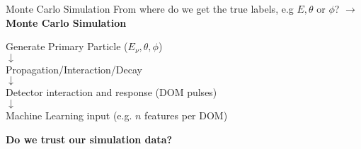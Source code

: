 \begin{frame}{Monte Carlo Simulation}
    From where do we get the true labels, e.g $E, \theta$ or $\phi$?
    $\rightarrow$ \textbf{Monte Carlo Simulation} \\
    \vspace{1em}
    \begin{center}
        Generate Primary Particle ($E_\nu, \theta, \phi$)\\
        $\downarrow$\\
        Propagation/Interaction/Decay
        \\$\downarrow$\\
            Detector interaction and response (DOM pulses)
            \\$\downarrow$\\
        Machine Learning input (e.g. $n$ features per DOM)
    \end{center}
    \pause
    \textbf{Do we trust our simulation data?}
\end{frame}